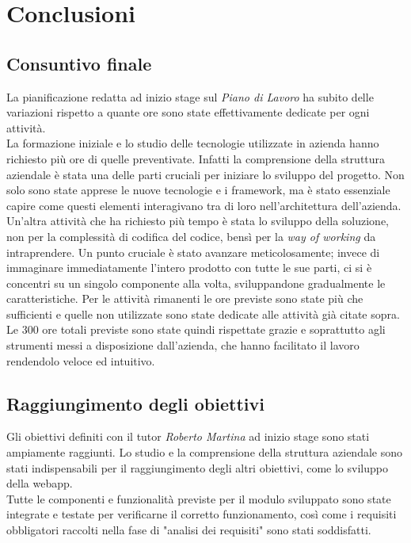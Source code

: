 \chapter{Conclusioni}
\label{cap:conclusioni}

\section{Consuntivo finale}
La pianificazione redatta ad inizio stage sul \textit{Piano di Lavoro} ha subito delle variazioni rispetto a quante ore sono state effettivamente dedicate per ogni attività.\\ La formazione iniziale e lo studio delle tecnologie utilizzate in azienda hanno richiesto più ore di quelle preventivate. Infatti la comprensione della struttura aziendale è stata una delle parti cruciali per iniziare lo sviluppo del progetto. Non solo sono state apprese le nuove tecnologie e i framework, ma è stato essenziale capire come questi elementi interagivano tra di loro nell'architettura dell'azienda. \\
Un'altra attività che ha richiesto più tempo è stata lo sviluppo della soluzione, non per la complessità di codifica del codice,  bensì per la \textit{way of working} da intraprendere. Un punto cruciale è stato avanzare meticolosamente; invece di immaginare immediatamente l'intero prodotto con tutte le sue parti, ci si è concentri su un singolo componente alla volta, sviluppandone gradualmente le caratteristiche.
Per le attività rimanenti le ore previste sono state più che sufficienti e quelle non utilizzate sono state dedicate alle attività già citate sopra. \\
Le 300 ore totali previste sono state quindi rispettate grazie e soprattutto agli strumenti messi a disposizione dall'azienda, che hanno facilitato il lavoro rendendolo veloce ed intuitivo.

\section{Raggiungimento degli obiettivi}
Gli obiettivi definiti con il tutor \textit{Roberto Martina} ad inizio stage sono stati ampiamente raggiunti. Lo studio e la comprensione della struttura aziendale sono stati indispensabili per il raggiungimento degli altri obiettivi, come lo sviluppo della webapp. \\
Tutte le componenti e funzionalità previste per il modulo sviluppato sono state integrate e testate per verificarne il corretto funzionamento, così come i requisiti obbligatori raccolti nella fase di "analisi dei requisiti" sono stati soddisfatti. 
\newpage
